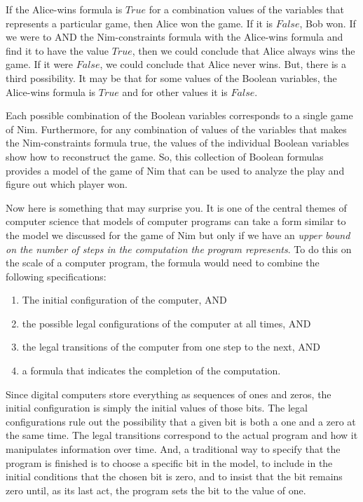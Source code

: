 {{If the Alice-wins formula is $True$
for a combination values of the variables that represents a particular game,
then Alice won the game. If it is $False$, Bob won.
If we were to AND the Nim-constraints formula with the Alice-wins formula
and find it to have the value $True$, then we could conclude that Alice always wins the game.
If it were $False$, we could conclude that Alice never wins.
But, there is a third possibility.
It may be that for some values of the Boolean variables,
the Alice-wins formula is $True$
and for other values it is $False$.

Each possible combination of the Boolean variables
corresponds to a single game of Nim.
Furthermore, for any combination of values of the variables that makes the
Nim-constraints formula true, the values of the individual Boolean variables
show how to reconstruct the game.
So, this collection of Boolean formulas provides a model of the game of Nim
that can be used to analyze the play and figure out which player won.

Now here is something that may surprise you.
It is one of the central themes of computer science
that models of computer programs can take a form
similar to the model we discussed for the game of Nim
but only if we have an \emph{upper bound on the number of
steps in the computation the program represents}.
To do this on the scale of a computer program,
the formula would need to combine the following specifications:
\begin{enumerate}
\item The initial configuration of the computer, AND
\item the possible legal configurations of the computer at all times, AND
\item the legal transitions of the computer from one step to the next, AND
\item a formula that indicates the completion of the computation.
\end{enumerate}

Since digital computers store everything as sequences of ones and zeros,
the initial configuration is simply the initial values of those bits.
The legal configurations rule out the possibility that a given bit is both a
one and a zero at the same time.
The legal transitions correspond to the actual program and how it manipulates information
over time. And, a traditional way to specify that the program is finished
is to choose a specific bit in the model, to include in the initial conditions
that the chosen bit is zero, and to insist that
the bit remains zero until, as its last act,
the program sets the bit to the value of one.

}}
